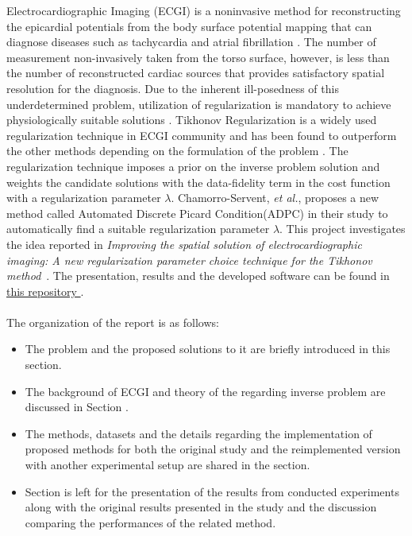 \documentclass[draftcls, onecolumn, journal]{IEEEtran}
\begin{document}
\indent Electrocardiographic Imaging (ECGI) is a noninvasive method for reconstructing the epicardial potentials from the body surface potential mapping that can diagnose diseases such as tachycardia \cite{intini2005electrocardiographic} and atrial fibrillation \cite{figuera2016regularization,schuler2017ecg}. The number of measurement non-invasively taken from the torso surface, however, is less than the number of reconstructed cardiac sources that provides satisfactory spatial resolution for the diagnosis. Due to the inherent ill-posedness of this underdetermined problem, utilization of regularization is mandatory to achieve physiologically suitable solutions \cite{milanivc2014assessment}. Tikhonov Regularization is a widely used regularization technique in ECGI community and has been found to outperform the other methods depending on the formulation of the problem \cite*{milanivc2014assessment}. The regularization technique imposes a prior on the inverse problem solution and weights the candidate solutions with the data-fidelity term in the cost function with a regularization parameter $\lambda$. Chamorro-Servent, \textit{et al.}, proposes a new method called Automated Discrete Picard Condition(ADPC) in their study \cite*{chamorro2017improving} to automatically find a suitable regularization parameter $\lambda$. 
This project investigates the idea reported in \textit{Improving the spatial solution of electrocardiographic
imaging: A new regularization parameter choice technique for the Tikhonov method}~\cite{chamorro2017improving}. The presentation, results and the developed software can be found in \href{https://github.com/kutay-ugurlu/Tikhonov-Regularization-Parameter-Selection-ECGI}{this repository \faExternalLink*}  .
\\
\\
The organization of the report is as follows:
\begin{itemize}
    \item The problem and the proposed solutions to it are briefly introduced in this section.
    \item The background of ECGI and theory of the regarding inverse problem are discussed in Section .
    \item The methods, datasets and the details regarding the implementation of proposed methods for both the original study and the reimplemented version with another experimental setup are shared in the  section.
    \item Section  is left for the presentation of the results from conducted experiments along with the original results presented in the study and the discussion comparing the performances of the related method.
\end{itemize}
\end{document}
